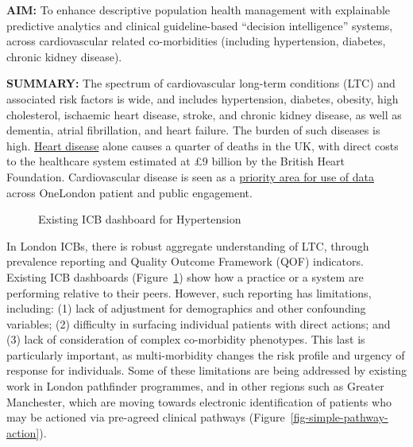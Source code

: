 \documentclass[
  letterpaper,
  DIV=11,
  numbers=noendperiod]{scrartcl}
\begin{document}
\textbf{AIM:} To enhance descriptive population health management with
explainable predictive analytics and clinical guideline-based ``decision
intelligence'' systems, across cardiovascular related co-morbidities
(including hypertension, diabetes, chronic kidney disease).

\textbf{SUMMARY:} The spectrum of cardiovascular long-term conditions
(LTC) and associated risk factors is wide, and includes hypertension,
diabetes, obesity, high cholesterol, ischaemic heart disease, stroke,
and chronic kidney disease, as well as dementia, atrial fibrillation,
and heart failure. The burden of such diseases is high.
\href{https://cks.nice.org.uk/topics/cvd-risk-assessment-management/background-information/burden-of-cvd/}{Heart
disease} alone causes a quarter of deaths in the UK, with direct costs
to the healthcare system estimated at £9 billion by the British Heart
Foundation. Cardiovascular disease is seen as a
\href{https://imperialcollegehealthpartners.com/portfolio/onelondon/}{priority
area for use of data} across OneLondon patient and public engagement.

\begin{figure}


\caption{\label{fig-icb-hypertension}Existing ICB dashboard for
Hypertension}

\end{figure}%

In London ICBs, there is robust aggregate understanding of LTC, through
prevalence reporting and Quality Outcome Framework (QOF) indicators.
Existing ICB dashboards (Figure~\ref{fig-icb-hypertension}) show how a
practice or a system are performing relative to their peers. However,
such reporting has limitations, including: (1) lack of adjustment for
demographics and other confounding variables; (2) difficulty in
surfacing individual patients with direct actions; and (3) lack of
consideration of complex co-morbidity phenotypes. This last is
particularly important, as multi-morbidity changes the risk profile and
urgency of response for individuals. Some of these limitations are being
addressed by existing work in London pathfinder programmes, and in other
regions such as Greater Manchester, which are moving towards electronic
identification of patients who may be actioned via pre-agreed clinical
pathways (Figure~\ref{fig-simple-pathway-action}).
\end{document}

